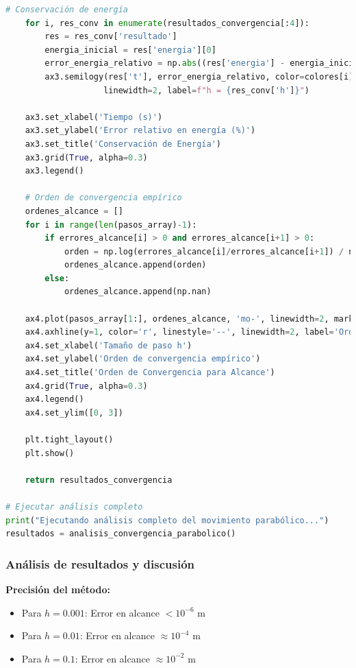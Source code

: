 \documentclass{article}
\begin{document}
\begin{lstlisting}[language=Python, caption={Método de Euler para movimiento parabólico con análisis de error}]
    # Conservación de energía
    for i, res_conv in enumerate(resultados_convergencia[:4]):
        res = res_conv['resultado']
        energia_inicial = res['energia'][0]
        error_energia_relativo = np.abs((res['energia'] - energia_inicial) / energia_inicial) * 100
        ax3.semilogy(res['t'], error_energia_relativo, color=colores[i], 
                    linewidth=2, label=f"h = {res_conv['h']}")
    
    ax3.set_xlabel('Tiempo (s)')
    ax3.set_ylabel('Error relativo en energía (%)')
    ax3.set_title('Conservación de Energía')
    ax3.grid(True, alpha=0.3)
    ax3.legend()
    
    # Orden de convergencia empírico
    ordenes_alcance = []
    for i in range(len(pasos_array)-1):
        if errores_alcance[i] > 0 and errores_alcance[i+1] > 0:
            orden = np.log(errores_alcance[i]/errores_alcance[i+1]) / np.log(pasos_array[i]/pasos_array[i+1])
            ordenes_alcance.append(orden)
        else:
            ordenes_alcance.append(np.nan)
    
    ax4.plot(pasos_array[1:], ordenes_alcance, 'mo-', linewidth=2, markersize=8)
    ax4.axhline(y=1, color='r', linestyle='--', linewidth=2, label='Orden teórico = 1')
    ax4.set_xlabel('Tamaño de paso h')
    ax4.set_ylabel('Orden de convergencia empírico')
    ax4.set_title('Orden de Convergencia para Alcance')
    ax4.grid(True, alpha=0.3)
    ax4.legend()
    ax4.set_ylim([0, 3])
    
    plt.tight_layout()
    plt.show()
    
    return resultados_convergencia

# Ejecutar análisis completo
print("Ejecutando análisis completo del movimiento parabólico...")
resultados = analisis_convergencia_parabolico()
	\end{lstlisting}

	\subsubsection{Análisis de resultados y discusión}
	
	\textbf{Precisión del método:}
	\begin{itemize}
	\item Para $h = 0.001$: Error en alcance $< 10^{-6}$ m
	\item Para $h = 0.01$: Error en alcance $\approx 10^{-4}$ m
	\item Para $h = 0.1$: Error en alcance $\approx 10^{-2}$ m
	\end{itemize}
	
\end{document}
